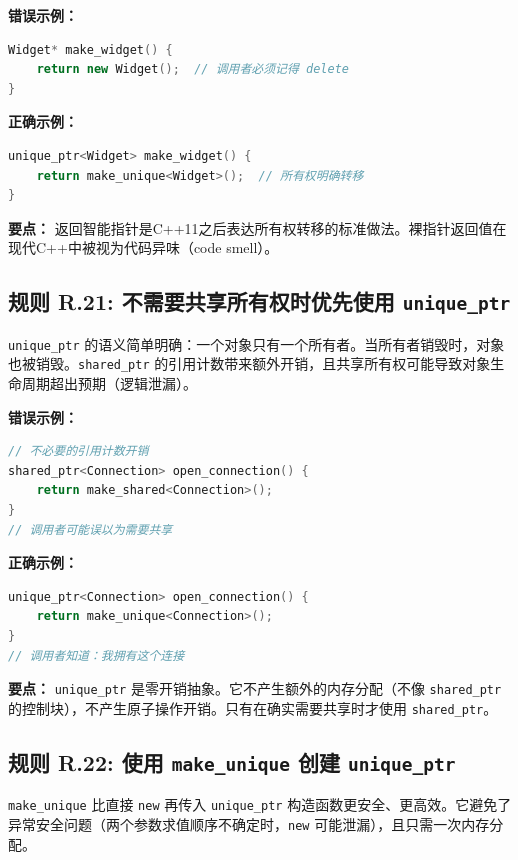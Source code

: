 \textbf{错误示例：}

\begin{lstlisting}[language=C++]
Widget* make_widget() {
    return new Widget();  // 调用者必须记得 delete
}
\end{lstlisting}

\textbf{正确示例：}

\begin{lstlisting}[language=C++]
unique_ptr<Widget> make_widget() {
    return make_unique<Widget>();  // 所有权明确转移
}
\end{lstlisting}

\textbf{要点：} 返回智能指针是C++11之后表达所有权转移的标准做法。裸指针返回值在现代C++中被视为代码异味（code smell）。

\subsection*{\textbf{规则 R.21:} 不需要共享所有权时优先使用 \texttt{unique\_ptr}}

\texttt{unique\_ptr} 的语义简单明确：一个对象只有一个所有者。当所有者销毁时，对象也被销毁。\texttt{shared\_ptr} 的引用计数带来额外开销，且共享所有权可能导致对象生命周期超出预期（逻辑泄漏）。

\textbf{错误示例：}

\begin{lstlisting}[language=C++]
// 不必要的引用计数开销
shared_ptr<Connection> open_connection() {
    return make_shared<Connection>();
}
// 调用者可能误以为需要共享
\end{lstlisting}

\textbf{正确示例：}

\begin{lstlisting}[language=C++]
unique_ptr<Connection> open_connection() {
    return make_unique<Connection>();
}
// 调用者知道：我拥有这个连接
\end{lstlisting}

\textbf{要点：} \texttt{unique\_ptr} 是零开销抽象。它不产生额外的内存分配（不像 \texttt{shared\_ptr} 的控制块），不产生原子操作开销。只有在确实需要共享时才使用 \texttt{shared\_ptr}。

\subsection*{\textbf{规则 R.22:} 使用 \texttt{make\_unique} 创建 \texttt{unique\_ptr}}

\texttt{make\_unique} 比直接 \texttt{new} 再传入 \texttt{unique\_ptr} 构造函数更安全、更高效。它避免了异常安全问题（两个参数求值顺序不确定时，\texttt{new} 可能泄漏），且只需一次内存分配。


